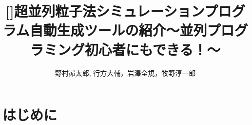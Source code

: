 \documentclass[twocolumn,10pt]{jarticle}
\title{%
[]超並列粒子法シミュレーションプログラム自動生成ツールの紹介～並列プログラミング初心者にもできる！～
}
\author{%
野村昴太郎, 行方大輔，岩澤全規，牧野淳一郎
}
\affiliation{%
神戸大学 惑星科学研究センター,
理化学研究所 計算科学研究センター
}
\begin{document}
\maketitle

\section{はじめに} %



\end{document}
